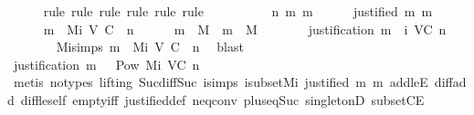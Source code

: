 \begin{isabellebody}
\ \ \ \ \isamarkupfalse%
\ {\isacharparenleft}rule{\isacharcomma}\ rule{\isacharcomma}\ rule{\isacharcomma}\ rule{\isacharcomma}\ rule{\isacharcomma}\ rule{\isacharparenright}\isanewline
\ \ \isamarkupfalse%
\ {\isacharminus}\isanewline
\ \ \ \ \isamarkupfalse%
\ n\ m\ m{\isacharprime}\isanewline
\ \ \ \ \isamarkupfalse%
\ {\isachardoublequoteopen}justified\ m{\isacharprime}\ m{\isachardoublequoteclose}\ \isanewline
\ \ \ \ \isamarkupfalse%
\ {\isachardoublequoteopen}m\ {\isasymin}\ M{\isacharunderscore}i\ {\isacharparenleft}V{\isacharcomma}\ C{\isacharcomma}\ {\isasymepsilon}{\isacharparenright}\ n{\isachardoublequoteclose}\isanewline
\ \ \ \ \isamarkupfalse%
\ {\isachardoublequoteopen}m\ {\isasymin}\ M\ {\isasymand}\ m{\isacharprime}\ {\isasymin}\ M{\isachardoublequoteclose}\isanewline
\ \ \ \ \isamarkupfalse%
\ \isamarkupfalse%
\ {\isachardoublequoteopen}justification\ m\ {\isasymin}\ {\isasymSigma}{\isacharunderscore}i\ {\isacharparenleft}V{\isacharcomma}C{\isacharcomma}{\isasymepsilon}{\isacharparenright}\ n{\isachardoublequoteclose}\isanewline
\ \ \ \ \ \ \isamarkupfalse%
\ M{\isacharunderscore}i{\isachardot}simps\ {\isacartoucheopen}m\ {\isasymin}\ M{\isacharunderscore}i\ {\isacharparenleft}V{\isacharcomma}\ C{\isacharcomma}\ {\isasymepsilon}{\isacharparenright}\ n{\isacartoucheclose}\ \isamarkupfalse%
\ blast\isanewline
\ \ \ \ \isamarkupfalse%
\ \isamarkupfalse%
\ {\isachardoublequoteopen}justification\ m\ {\isasymin}\ \ Pow\ {\isacharparenleft}M{\isacharunderscore}i\ {\isacharparenleft}V{\isacharcomma}C{\isacharcomma}{\isasymepsilon}{\isacharparenright}\ {\isacharparenleft}n\ {\isacharminus}\ {}{\isacharparenright}{\isacharparenright}{\isachardoublequoteclose}\isanewline
\ \ \ \ \ \ \isamarkupfalse%
\ {\isacharparenleft}metis\ {\isacharparenleft}no{\isacharunderscore}types{\isacharcomma}\ lifting{\isacharparenright}\ Suc{\isacharunderscore}diff{\isacharunderscore}Suc\ {\isasymSigma}{\isacharunderscore}i{\isachardot}simps{\isacharparenleft}{}{\isacharparenright}\ {\isasymSigma}i{\isacharunderscore}subset{\isacharunderscore}Mi\ {\isacartoucheopen}justified\ m{\isacharprime}\ m{\isacartoucheclose}\ add{\isacharunderscore}leE\ diff{\isacharunderscore}add\ diff{\isacharunderscore}le{\isacharunderscore}self\ empty{\isacharunderscore}iff\ justified{\isacharunderscore}def\ neq{}{\isacharunderscore}conv\ plus{\isacharunderscore}{}{\isacharunderscore}eq{\isacharunderscore}Suc\ singletonD\ subsetCE{\isacharparenright}\isanewline

\end{isabellebody}
